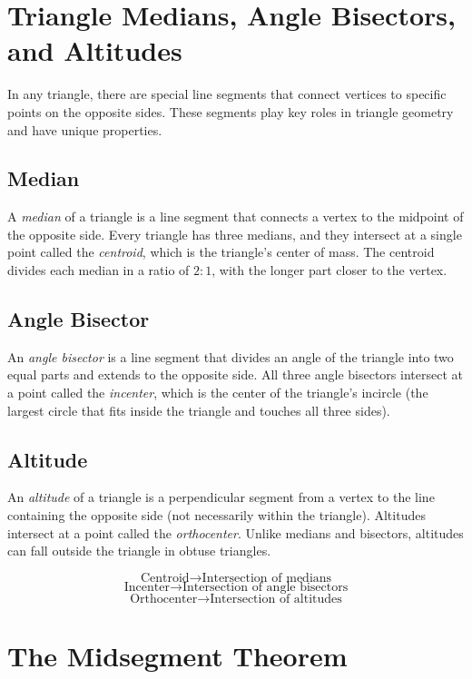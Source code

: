 \section{Triangle Medians, Angle Bisectors, and Altitudes}

In any triangle, there are special line segments that connect vertices to specific points on the 
opposite sides. These segments play key roles in triangle geometry and have unique properties.

\subsection*{Median}

A \emph{median} of a triangle is a line segment that connects a vertex to the midpoint of the opposite 
side. Every triangle has three medians, and they intersect at a single point called the \emph{centroid}, 
which is the triangle’s center of mass. The centroid divides each median in a ratio of \( 2:1 \), with 
the longer part closer to the vertex.

\subsection*{Angle Bisector}

An \emph{angle bisector} is a line segment that divides an angle of the triangle into two equal parts and 
extends to the opposite side. All three angle bisectors intersect at a point called the \emph{incenter}, 
which is the center of the triangle's incircle (the largest circle that fits inside the triangle and 
touches all three sides).

\subsection*{Altitude}

An \emph{altitude} of a triangle is a perpendicular segment from a vertex to the line containing the 
opposite side (not necessarily within the triangle). Altitudes intersect at a point called the 
\emph{orthocenter}. Unlike medians and bisectors, altitudes can fall outside the triangle in obtuse 
triangles.

\[
	\text{Centroid} \rightarrow \text{Intersection of medians}\]
\[
	\text{Incenter} \rightarrow \text{Intersection of angle bisectors}\]
\[
	\text{Orthocenter} \rightarrow \text{Intersection of altitudes}
\]

\section{The Midsegment Theorem}

